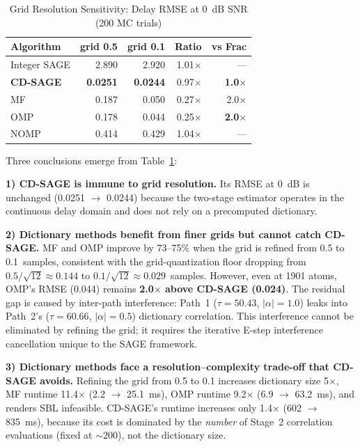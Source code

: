 \documentclass[a4paper,fleqn]{cas-dc}
\begin{document}
\begin{table}[width=.9\linewidth,cols=5,pos=h]
\centering
\caption{Grid Resolution Sensitivity: Delay RMSE at \SI{0}{dB} SNR (200 MC trials)}
\label{tab:grid_compare}
\footnotesize
\begin{tabular}{@{}lrrrr@{}}
\toprule
Algorithm & grid 0.5 & grid 0.1 & Ratio & vs Frac \\
\midrule
Integer SAGE & 2.890 & 2.920 & 1.01$\times$ & --- \\
\textbf{CD-SAGE} & \textbf{0.0251} & \textbf{0.0244} & 0.97$\times$ & \textbf{1.0$\times$} \\
MF  & 0.187 & 0.050 & 0.27$\times$ & 2.0$\times$ \\
OMP & 0.178 & 0.044 & 0.25$\times$ & \textbf{2.0$\times$} \\
NOMP & 0.414 & 0.429 & 1.04$\times$ & --- \\
\bottomrule
\end{tabular}
\end{table}

Three conclusions emerge from Table~\ref{tab:grid_compare}:

\textbf{1) CD-SAGE is immune to grid resolution.} Its RMSE at \SI{0}{dB} is unchanged (0.0251 $\to$ 0.0244) because the two-stage estimator operates in the continuous delay domain and does not rely on a precomputed dictionary.

\textbf{2) Dictionary methods benefit from finer grids but cannot catch CD-SAGE.} MF and OMP improve by 73--75\% when the grid is refined from 0.5 to 0.1~samples, consistent with the grid-quantization floor dropping from $0.5/\sqrt{12} \approx 0.144$ to $0.1/\sqrt{12} \approx 0.029$~samples. However, even at 1901 atoms, OMP's RMSE (0.044) remains \textbf{2.0$\times$ above CD-SAGE (0.024)}. The residual gap is caused by inter-path interference: Path~1 ($\tau=50.43$, $|\alpha|=1.0$) leaks into Path~2's ($\tau=60.66$, $|\alpha|=0.5$) dictionary correlation. This interference cannot be eliminated by refining the grid; it requires the iterative E-step interference cancellation unique to the SAGE framework.

\textbf{3) Dictionary methods face a resolution--complexity trade-off that CD-SAGE avoids.} Refining the grid from 0.5 to 0.1 increases dictionary size 5$\times$, MF runtime 11.4$\times$ (2.2 $\to$ \SI{25.1}{ms}), OMP runtime 9.2$\times$ (6.9 $\to$ \SI{63.2}{ms}), and renders SBL infeasible. CD-SAGE's runtime increases only 1.4$\times$ (602 $\to$ \SI{835}{ms}), because its cost is dominated by the \textit{number} of Stage~2 correlation evaluations (fixed at $\sim$200), not the dictionary size.
\end{document}
